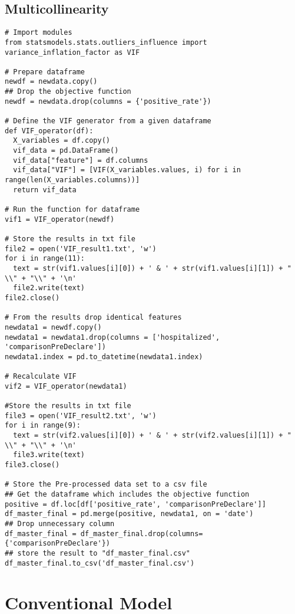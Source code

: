 \begin{appendices}
\subsection{Multicollinearity}
\begin{verbatim}
# Import modules
from statsmodels.stats.outliers_influence import variance_inflation_factor as VIF

# Prepare dataframe 
newdf = newdata.copy()
## Drop the objective function
newdf = newdata.drop(columns = {'positive_rate'})

# Define the VIF generator from a given dataframe 
def VIF_operator(df):
  X_variables = df.copy()
  vif_data = pd.DataFrame()
  vif_data["feature"] = df.columns
  vif_data["VIF"] = [VIF(X_variables.values, i) for i in range(len(X_variables.columns))]
  return vif_data

# Run the function for dataframe
vif1 = VIF_operator(newdf)

# Store the results in txt file
file2 = open('VIF_result1.txt', 'w')
for i in range(11):
  text = str(vif1.values[i][0]) + ' & ' + str(vif1.values[i][1]) + " \\" + "\\" + '\n'
  file2.write(text)
file2.close()

# From the results drop identical features
newdata1 = newdf.copy()
newdata1 = newdata1.drop(columns = ['hospitalized', 'comparisonPreDeclare'])
newdata1.index = pd.to_datetime(newdata1.index)

# Recalculate VIF
vif2 = VIF_operator(newdata1)

#Store the results in txt file
file3 = open('VIF_result2.txt', 'w')
for i in range(9):
  text = str(vif2.values[i][0]) + ' & ' + str(vif2.values[i][1]) + " \\" + "\\" + '\n'
  file3.write(text)
file3.close()

# Store the Pre-processed data set to a csv file
## Get the dataframe which includes the objective function
positive = df.loc[df['positive_rate', 'comparisonPreDeclare']]
df_master_final = pd.merge(positive, newdata1, on = 'date')
## Drop unnecessary column
df_master_final = df_master_final.drop(columns={'comparisonPreDeclare'})
## store the result to "df_master_final.csv"
df_master_final.to_csv('df_master_final.csv')
\end{verbatim}

\section{Conventional Model}

\end{appendices}
